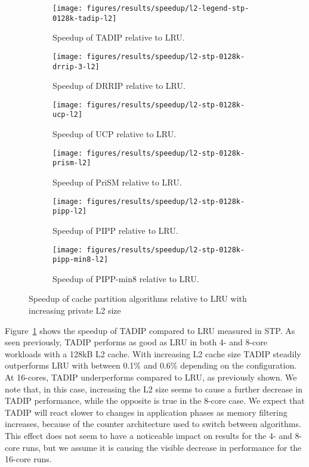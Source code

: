 \begin{figure}[!th]
    \centering
    \begin{subfigure}[b]{0.5\textwidth}
        \texttt{[image: figures/results/speedup/l2-legend-stp-0128k-tadip-l2]}
        \caption{Speedup of TADIP relative to LRU.}
        \label{fig:results:l2:tadip}
    \end{subfigure}%
    \begin{subfigure}[b]{0.5\textwidth}
        \texttt{[image: figures/results/speedup/l2-stp-0128k-drrip-3-l2]}
        \caption{Speedup of DRRIP relative to LRU.}
        \label{fig:results:l2:drrip}
    \end{subfigure}
    \begin{subfigure}[b]{0.5\textwidth}
        \texttt{[image: figures/results/speedup/l2-stp-0128k-ucp-l2]}
        \caption{Speedup of UCP relative to LRU.}
        \label{fig:results:l2:ucp}
    \end{subfigure}%
    \begin{subfigure}[b]{0.5\textwidth}
        \texttt{[image: figures/results/speedup/l2-stp-0128k-prism-l2]}
        \caption{Speedup of PriSM relative to LRU.}
        \label{fig:results:l2:prism}
    \end{subfigure}
    \begin{subfigure}[b]{0.5\textwidth}
        \texttt{[image: figures/results/speedup/l2-stp-0128k-pipp-l2]}
        \caption{Speedup of PIPP relative to LRU.}
        \label{fig:results:l2:pipp}
    \end{subfigure}%
    \begin{subfigure}[b]{0.5\textwidth}
        \texttt{[image: figures/results/speedup/l2-stp-0128k-pipp-min8-l2]}
        \caption{Speedup of PIPP-min8 relative to LRU.}
        \label{fig:results:l2:pipp-min8}
    \end{subfigure}
    \caption[Speedup with increasing L2 size]{Speedup of cache partition algorithms relative to LRU with increasing private L2 size}
    \label{fig:results:l2}
\end{figure}

Figure~\ref{fig:results:l2:tadip} shows the speedup of TADIP compared to LRU measured in STP. 
As seen previously, TADIP performs as good as LRU in both 4- and 8-core workloads with a 128kB L2 cache.
With increasing L2 cache size TADIP steadily outperforms LRU with between 0.1\% and 0.6\% depending on the configuration. 
At 16-cores, TADIP underperforms compared to LRU, as previously shown.
We note that, in this case, increasing the L2 size seems to cause a further decrease in TADIP performance, while the opposite is true in the 8-core case.
We expect that TADIP will react slower to changes in application phases as memory filtering increases, because of the counter architecture used to switch between algorithms.
This effect does not seem to have a noticeable impact on results for the 4- and 8-core runs, but we assume it is causing the visible decrease in performance for the 16-core runs.

